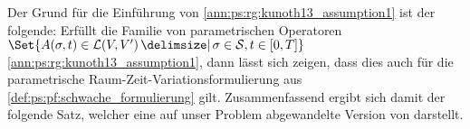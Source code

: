 


Der Grund für die Einführung von \cref{ann:ps:rg:kunoth13_assumption1} ist der folgende:
Erfüllt die Familie von parametrischen Operatoren $\Set{ A(\sigma, t) \in \mathcal L(V, V') \given \sigma \in \mathcal S, t \in [0, T] }$ \cref{ann:ps:rg:kunoth13_assumption1}, dann lässt sich zeigen, dass dies auch für die parametrische Raum-Zeit-Variationsformulierung aus \cref{def:ps:pf:schwache_formulierung} gilt.
Zusammenfassend ergibt sich damit der folgende Satz, welcher eine auf unser Problem abgewandelte Version von \cite[Theorem 21]{Kunoth:2013ef} darstellt.

